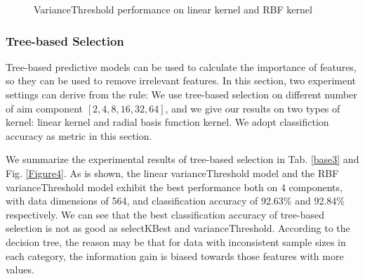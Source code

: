 \documentclass{article}
\begin{document}
\begin{figure}
	\centering
	\quad
	\caption{VarianceThreshold performance on linear kernel and RBF kernel}
	\label{Figure3}
\end{figure}

\subsubsection{Tree-based Selection}
Tree-based predictive models can be used to calculate the importance of features, so they can be used to remove irrelevant features. In this section, two experiment settings can derive from the rule: We use tree-based selection on different number of aim component $[2, 4, 8, 16, 32, 64]$, and we give our results on two types of kernel: linear kernel and radial basis function kernel. We adopt classifiction accuracy as metric in this section.

We summarize the experimental results of tree-based selection in Tab. \ref{base3} and Fig. \ref{Figure4}. As is shown, the linear varianceThreshold model and the RBF varianceThreshold model exhibit the best performance both on 4 components, with data dimensions of 564, and classification accuracy of 92.63\% and 92.84\% respectively. We can see that the best classification accuracy of tree-based selection is not as good as selectKBest and varianceThreshold. According to the decision tree, the reason may be that for data with inconsistent sample sizes in each category, the information gain is biased towards those features with more values.
\end{document}
